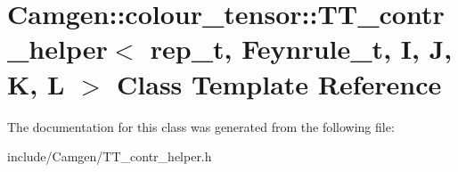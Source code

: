 \hypertarget{a00534}{\section{Camgen\-:\-:colour\-\_\-tensor\-:\-:T\-T\-\_\-contr\-\_\-helper$<$ rep\-\_\-t, Feynrule\-\_\-t, I, J, K, L $>$ Class Template Reference}
\label{a00534}
}


The documentation for this class was generated from the following file\-:\begin{DoxyCompactItemize}
\item 
include/\-Camgen/T\-T\-\_\-contr\-\_\-helper.\-h\end{DoxyCompactItemize}
